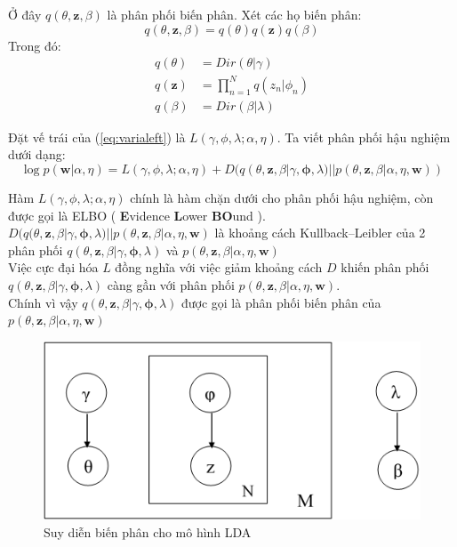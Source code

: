 \documentclass[fontsize=13pt]{scrartcl}
\begin{document}
Ở đây $q(\theta,\textbf{z},\beta) $ là phân phối biến phân. Xét các họ biến phân:
\begin{equation}
q(\theta,\textbf{z},\beta) = q(\theta)q(\textbf{z})q(\beta)
\end{equation}
Trong đó:
\begin{align}
q(\theta) &= Dir(\theta|\gamma)\\
q(\mathbf{z}) &= \prod_{n=1}^{N} q(z_n|\phi_n)\\
q(\beta) &= Dir(\beta | \lambda)
\end{align}

Đặt vế trái của (\ref{eq:varialeft}) là $L(\gamma,\phi,\lambda;\alpha,\eta)$. Ta viết phân phối hậu nghiệm dưới dạng:
\begin{equation}
\log p(\mathbf{w} | \alpha, \eta) = L(\gamma,\phi,\lambda;\alpha,\eta) + D(q(\theta,\mathbf{z},\beta| \gamma,\boldsymbol\phi,\lambda) || p(\theta,\mathbf{z},\beta | \alpha,\eta,\mathbf{w}))
\end{equation} 
\par Hàm $L(\gamma,\phi,\lambda;\alpha,\eta)$ chính là hàm chặn dưới cho phân phối hậu nghiệm, còn được gọi là ELBO ( \textbf{E}vidence \textbf{L}ower \textbf{BO}und ). $D(q(\theta,\mathbf{z},\beta| \gamma,\boldsymbol\phi,\lambda) || p(\theta,\mathbf{z},\beta | \alpha,\eta,\mathbf{w})$ là khoảng cách Kullback–Leibler của 2 phân phối $q(\theta,\mathbf{z},\beta| \gamma,\boldsymbol\phi,\lambda)$ và $p(\theta,\mathbf{z},\beta | \alpha,\eta,\mathbf{w})$\\
Việc cực đại hóa $L$ đồng nghĩa với việc giảm khoảng cách $D$ khiến phân phối  $q(\theta,\mathbf{z},\beta| \gamma,\boldsymbol\phi,\lambda)$ càng gần với phân phối $p(\theta,\mathbf{z},\beta | \alpha,\eta,\mathbf{w})$.\\
Chính vì vậy  $q(\theta,\mathbf{z},\beta| \gamma,\boldsymbol\phi,\lambda)$ được gọi là phân phối biến phân của $p(\theta,\mathbf{z},\beta | \alpha,\eta,\mathbf{w})$
\begin{figure}[H]
\begin{center}
\includegraphics[scale=0.6]{img/variationalinfer.png}
\end{center}
\label{fig:variationalinfer}
\caption{Suy diễn biến phân cho mô hình LDA}
\end{figure}
\end{document}
